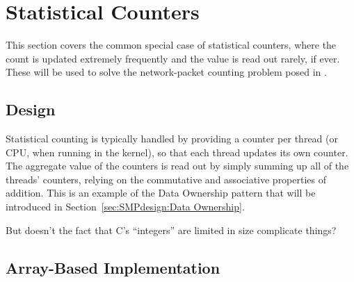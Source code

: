 \section{Statistical Counters}
\label{sec:count:Statistical Counters}

This section covers the common special case of statistical counters, where
the count is updated extremely frequently and the value is read out
rarely, if ever.
These will be used to solve the network-packet counting problem
posed in {\QQstatcnt}.

\subsection{Design}

Statistical counting is typically handled by providing a counter per
thread (or CPU, when running in the kernel), so that each thread
updates its own counter.
The aggregate value of the counters is read out by simply summing up
all of the threads' counters,
relying on the commutative and associative properties of addition.
This is an example of the Data Ownership pattern that will be introduced in
Section~\ref{sec:SMPdesign:Data Ownership}.

\QuickQuiz{}
	But doesn't the fact that C's ``integers'' are limited in size
	complicate things?
 \QuickQuizEnd

\subsection{Array-Based Implementation}
\label{sec:count:Array-Based Implementation}

